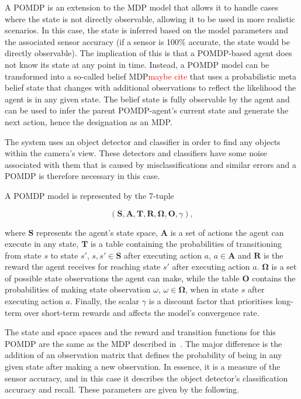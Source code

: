 \documentclass[runningheads]{llncs}
\newcommand\todo[1]{\textcolor{red}{#1}}
\begin{document}
A POMDP is an extension to the MDP model that allows it to handle cases where the state is not directly observable, allowing it to be used in more realistic scenarios. 
In this case, the state is inferred based on the model parameters and the associated sensor accuracy (if a sensor is 100\% accurate, the state would be directly observable).
The implication of this is that a POMDP-based agent does not know its state at any point in time.
Instead, a POMDP model can be transformed into a so-called belief MDP\todo{maybe cite} that uses a probabilistic meta belief state that changes with additional observations to reflect the likelihood the agent is in any given state.
The belief state is fully observable by the agent and can be used to infer the parent POMDP-agent's current state and generate the next action, hence the designation as an MDP.\@

The system uses an object detector and classifier in order to find any objects within the camera's view.
These detectors and classifiers have some noise associated with them that is caused by misclassifications and similar errors and a POMDP is therefore necessary in this case.

A POMDP model is represented by the 7-tuple

\begin{equation}
  (\mathbf{S}, \mathbf{A}, \mathbf{T}, \mathbf{R}, \mathbf{\Omega}, \mathbf{O}, \gamma),
\end{equation}

\noindent where $\mathbf{S}$ represents the agent's state space, $\mathbf{A}$ is a set of actions the agent can execute in any state, $\mathbf{T}$ is a table containing the probabilities of transitioning from state $s$ to state $s'$, $s, s' \in \mathbf{S}$ after executing action $a$, $a \in \mathbf{A}$ and $\mathbf{R}$ is the reward the agent receives for reaching state $s'$ after executing action $a$. $\mathbf{\Omega}$ is a set of possible state observations the agent can make, while the table $\mathbf{O}$ contains the probabilities of making state observation $\omega$, $\omega \in \mathbf{\Omega}$, when in state $s$ after executing action $a$. Finally, the scalar $\gamma$ is a discount factor that prioritises long-term over short-term rewards and affects the model's convergence rate. 

The state and space spaces and the reward and transition functions for this POMDP are the same as the MDP described in~\cite{lock2019active}. 
The major difference is the addition of an observation matrix that defines the probability of being in any given state after making a new observation.
In essence, it is a measure of the sensor accuracy, and in this case it describes the object detector's classification accuracy and recall.
These parameters are given by the following. 
\end{document}
